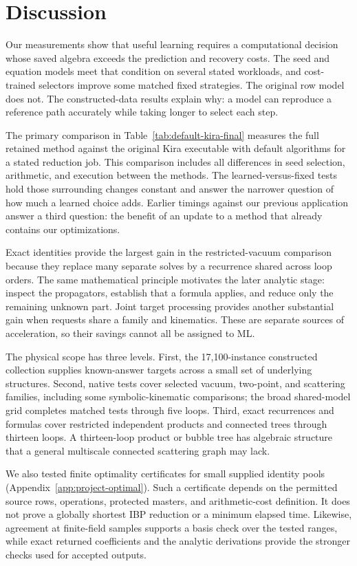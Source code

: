 \section{Discussion}
\label{sec:discussion}
Our measurements show that useful learning requires a computational decision whose saved algebra exceeds the prediction and recovery costs. The seed and equation models meet that condition on several stated workloads, and cost-trained selectors improve some matched fixed strategies. The original row model does not. The constructed-data results explain why: a model can reproduce a reference path accurately while taking longer to select each step.

The primary comparison in Table~\ref{tab:default-kira-final} measures the full retained method against the original Kira executable with default algorithms for a stated reduction job. This comparison includes all differences in seed selection, arithmetic, and execution between the methods. The learned-versus-fixed tests hold those surrounding changes constant and answer the narrower question of how much a learned choice adds. Earlier timings against our previous application answer a third question: the benefit of an update to a method that already contains our optimizations.

Exact identities provide the largest gain in the restricted-vacuum comparison because they replace many separate solves by a recurrence shared across loop orders. The same mathematical principle motivates the later analytic stage: inspect the propagators, establish that a formula applies, and reduce only the remaining unknown part. Joint target processing provides another substantial gain when requests share a family and kinematics. These are separate sources of acceleration, so their savings cannot all be assigned to ML.

The physical scope has three levels. First, the 17,100-instance constructed collection supplies known-answer targets across a small set of underlying structures. Second, native tests cover selected vacuum, two-point, and scattering families, including some symbolic-kinematic comparisons; the broad shared-model grid completes matched tests through five loops. Third, exact recurrences and formulas cover restricted independent products and connected trees through thirteen loops. A thirteen-loop product or bubble tree has algebraic structure that a general multiscale connected scattering graph may lack.

We also tested finite optimality certificates for small supplied identity pools (Appendix~\ref{app:project-optimal}). Such a certificate depends on the permitted source rows, operations, protected masters, and arithmetic-cost definition. It does not prove a globally shortest IBP reduction or a minimum elapsed time. Likewise, agreement at finite-field samples supports a basis check over the tested ranges, while exact returned coefficients and the analytic derivations provide the stronger checks used for accepted outputs.

